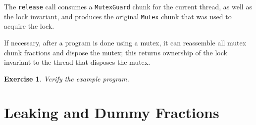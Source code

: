 \documentclass{article}
\newtheorem{exercise}{Exercise}
\begin{document}
The \lstinline!release! call consumes a
\lstinline!MutexGuard! chunk for the current thread, as well as
the lock invariant, and produces the original \lstinline!Mutex!
chunk that was used to acquire the lock.

If necessary, after a program is done using a mutex, it can reassemble all mutex chunk fractions and
dispose the mutex; this returns ownership of the lock invariant to the thread that disposes the mutex.

\begin{exercise}\label{exercise:mutexes}
Verify the example program.
\end{exercise}

\section{Leaking and Dummy Fractions}\label{section:leaking}
\end{document}
